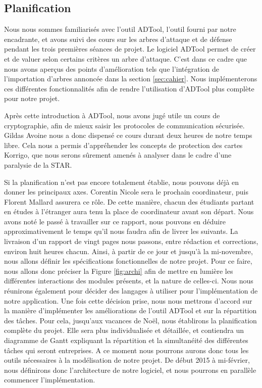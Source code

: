 	    
				\subsection{Planification}
		Nous nous sommes familiarisés avec l'outil ADTool, l'outil fourni par notre encadrante, et avons suivi des cours sur les arbres d'attaque et de défense pendant les trois premières séances de projet. Le logiciel ADTool permet de créer et de valuer selon certains critères un arbre d'attaque. C'est dans ce cadre que nous avons aperçus des points d'amélioration tels que l'intégration de l'importation d'arbres annoncée dans la section \ref{sec:cahier}. Nous implémenterons ces différentes fonctionnalités afin de rendre l'utilisation d'ADTool plus complète pour notre projet.
	    
	    Après cette introduction à ADTool, nous avons jugé utile un cours de cryptographie, afin de mieux saisir les protocoles de communication sécurisée. Gildas Avoine nous a donc dispensé ce cours durant deux heures de notre temps libre. Cela nous a permis d'appréhender les concepts de protection des cartes Korrigo, que nous serons sûrement amenés à analyser dans le cadre d'une paralysie de la STAR.
			
		Si la planification n'est pas encore totalement établie, nous pouvons déjà en donner les principaux axes.
		Corentin Nicole sera le prochain coordinateur, puis Florent Mallard assurera ce rôle. De cette manière, chacun des étudiants partant en études à l'étranger aura tenu la place de coordinateur avant son départ.
		Nous avons noté le passé à travailler sur ce rapport, nous pouvons en déduire approximativement le temps qu'il nous faudra afin de livrer les suivants. La livraison d'un rapport de vingt pages nous passons, entre rédaction et corrections, environ huit heures chacun.
		Ainsi, à partir de ce jour et jusqu'à la mi-novembre, nous allons définir les spécifications fonctionnelles de notre projet.
		Pour ce faire, nous allons donc préciser la Figure \ref{fig:archi} afin de mettre en lumière les différentes interactions des modules présents, et la nature de celles-ci. Nous nous réunirons également pour décider des langages à utiliser pour l'implémentation de notre application.
		Une fois cette décision prise, nous nous mettrons d'accord sur la manière d'implémenter les améliorations de l'outil ADTool et sur la répartition des tâches.
		Pour cela, jusqu'aux vacances de Noël, nous établirons la planification complète du projet. Elle sera plus individualisée et détaillée, et contiendra un diagramme de Gantt expliquant la répartition et la simultanéité des différentes tâches qui seront entreprises.
		A ce moment nous pourrons aurons donc tous les outils nécessaires à la modélisation de notre projet.
		De début 2015 à mi-février, nous définirons donc l'architecture de notre logiciel, et nous pourrons en parallèle commencer l'implémentation.

	    
